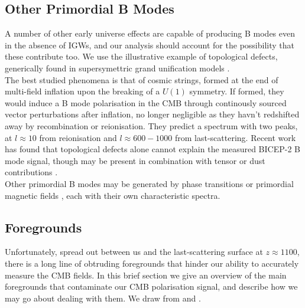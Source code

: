 \documentclass[a4paper,10pt]{article}
\begin{document}
\subsection{Other Primordial B Modes}
\label{vectorissues}

A number of other early universe effects are capable of producing B modes even in the absence of IGWs, and our analysis should account for the possibility that these contribute too. We use the illustrative example of topological defects, generically found in supersymettric grand unification models \cite{CMBPol}.\\

The best studied phenomena is that of cosmic strings, formed at the end of multi-field inflation upon the breaking of a $U(1)$ symmetry. If formed, they would induce a B mode polarisation in the CMB through continously sourced vector perturbations after inflation, no longer negligible as they havn't redshifted away by recombination or reionisation. They predict a spectrum with two peaks, at $l\approx10$ from reionisation and $l\approx 600-1000$ from last-scattering. Recent work has found that topological defects alone cannot explain the measured BICEP-2 B mode signal, though may be present in combination with tensor or dust contributions \cite{baddefects}.\\

Other primordial B modes may be generated by phase transitions \cite{phase} or primordial magnetic fields \cite{magnetic}, each with their own characteristic spectra.

\subsection{Foregrounds}

Unfortunately, spread out between us and the last-scattering surface at $z\approx 1100$, there is a long line of obtruding foregrounds that hinder our ability to accurately measure the CMB fields. In this brief section we give an overview of the main foregrounds that contaminate our CMB polarisation signal, and describe how we may go about dealing with them. We draw from \cite{thesis} and \cite{foregrounds}.\\
\end{document}
